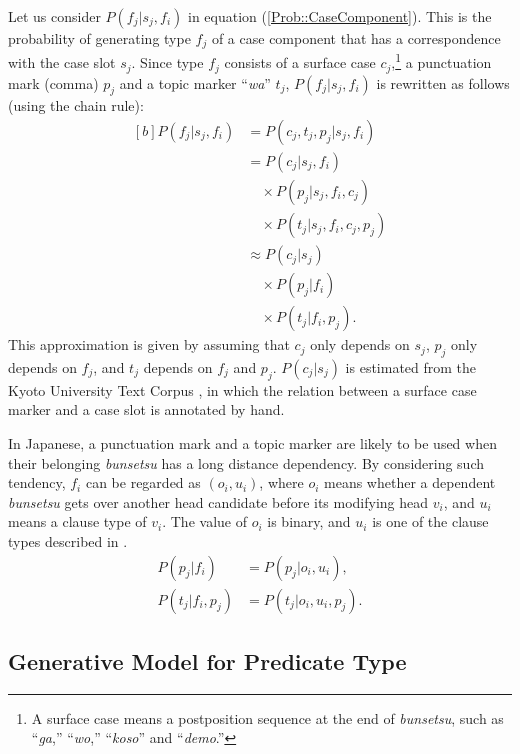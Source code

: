 \documentclass[english]{jnlp_1.4_rep}
\begin{document}
Let us consider $P(f_j|s_j, f_i)$ in equation
(\ref{Prob::CaseComponent}). This is the probability of generating 
type $f_j$ of a case component that has a correspondence with
the case slot $s_j$. Since type $f_j$ consists of a surface
case $c_j$,\footnote{A surface case means a postposition sequence at the
end of \textit{bunsetsu}, such as ``\textit{ga},'' ``\textit{wo},''
``\textit{koso}'' and ``\textit{demo}.''} a punctuation mark (comma)
$p_j$ and a topic marker ``\textit{wa}'' $t_j$, $P(f_j|s_j, f_i)$ is
rewritten as follows (using the chain rule):
\begin{equation}
\begin{aligned}[b]
  P(f_j|s_j, f_i) & = P(c_j,t_j,p_j|s_j,f_i) \\
  & = P(c_j|s_j,f_i)  \\
  & \quad \times P(p_j|s_j,f_i,c_j) \\
  & \quad \times P(t_j|s_j,f_i,c_j,p_j) \\
  & \approx P(c_j|s_j) \\
  & \quad \times P(p_j|f_i) \\
  & \quad \times P(t_j|f_i,p_j).
\end{aligned}
\end{equation}
This approximation is given by assuming that $c_j$ only depends on
$s_j$, $p_j$ only depends on $f_j$, and $t_j$ depends on $f_j$ and
$p_j$.  $P(c_j|s_j)$ is estimated from the Kyoto University Text Corpus
\cite{Kawahara2002ec}, in which the relation between a surface case
marker and a case slot is annotated by hand.

In Japanese, a punctuation mark and a topic marker are likely to be used
when their belonging \textit{bunsetsu} has a long distance
dependency. By considering such tendency, $f_i$ can be regarded as
$(o_i, u_i)$, where $o_i$ means whether a dependent \textit{bunsetsu}
gets over another head candidate before its modifying head $v_i$, and
$u_i$ means a clause type of $v_i$. The value of $o_i$ is binary, and
$u_i$ is one of the clause types described in \cite{Kawahara1999}.
\begin{align}
 P(p_j|f_i) & = P(p_j|o_i,u_i), \\
 P(t_j|f_i,p_j) & = P(t_j|o_i,u_i,p_j).
\end{align}


\subsection{Generative Model for Predicate Type}
\end{document}

